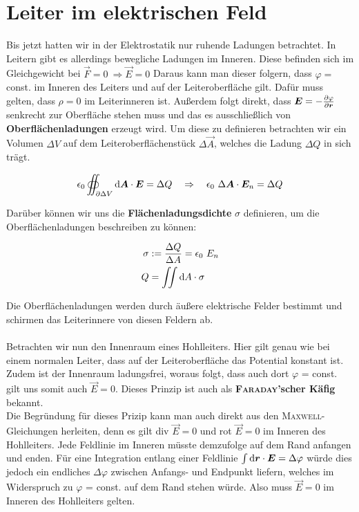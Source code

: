 \section{Leiter im elektrischen Feld}

Bis jetzt hatten wir in der Elektrostatik nur ruhende Ladungen betrachtet. In Leitern  gibt es allerdings bewegliche Ladungen im Inneren. Diese befinden sich im Gleichgewicht bei $\vec{F}=0 \ \Rightarrow \vec{E}= 0$
Daraus kann man dieser folgern, dass $\varphi =$ const. im Inneren des Leiters und auf der Leiteroberfläche gilt. Dafür muss gelten, dass $\rho = 0$ im Leiterinneren ist. Außerdem folgt direkt, dass $\bm{E} = -\frac{\partial{\varphi}}{\partial{\bm{r}}}$ senkrecht zur Oberfläche stehen muss und das es ausschließlich von \textbf{Oberflächenladungen} erzeugt wird. Um diese zu definieren betrachten wir ein Volumen $\Delta V$ auf dem Leiteroberflächenstück $\Delta \vec{A}$, welches die Ladung $\Delta Q$ in sich trägt.

\begin{equation*}
\epsilon_0 \oiint_{\partial\Delta V}\d\vec{A}\cdot\vec{E} = \Delta Q \quad \Rightarrow \quad \epsilon_0 \ \Delta\vec{A}\cdot\vec{E}_n = \Delta Q
\end{equation*}

Darüber können wir uns die \textbf{Flächenladungsdichte} $\sigma$ definieren, um die Oberflächenladungen beschreiben zu können:

\begin{align*}
\sigma &:= \frac{\Delta Q}{\Delta A} = \epsilon_0 \ E_n\\
Q  &= \iint\mathrm{d} A \cdot \sigma
\end{align*}

Die Oberflächenladungen werden durch äußere elektrische Felder bestimmt und schirmen das Leiterinnere von diesen Feldern ab.\
\\
\ \\
Betrachten wir nun den Innenraum eines Hohlleiters. Hier gilt genau wie bei einem normalen Leiter, dass auf der Leiteroberfläche das Potential konstant ist. Zudem ist der Innenraum ladungsfrei, woraus folgt, dass auch dort $\varphi$ = const. gilt uns somit auch $\vec{E} = 0$. Dieses Prinzip ist auch als \textbf{\textsc{Faraday}'scher Käfig} bekannt.\
\\
Die Begründung für dieses Prizip kann man auch direkt aus den \textsc{Maxwell}-Gleichungen herleiten, denn es gilt div $\vec{E} = 0$ und rot $\vec{E} = 0$ im Inneren des Hohlleiters. Jede Feldlinie im Inneren müsste demzufolge auf dem Rand anfangen und enden. Für eine Integration entlang einer Feldlinie $\int\mathrm{d} \bm{r} \cdot \bm{E} = \Delta \varphi$ würde dies jedoch ein endliches $\Delta \varphi$ zwischen Anfangs- und Endpunkt liefern, welches im Widerspruch zu $\varphi$ = const. auf dem Rand stehen würde. Also muss $\vec{E} = 0$ im Inneren des Hohlleiters gelten.

